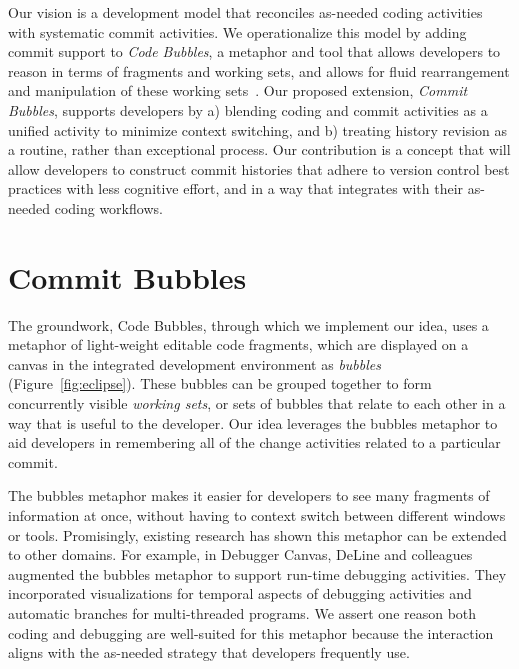 \documentclass[conference]{IEEEtran}
\newcommand{\purpose}[1]{}
\begin{document}
\purpose{we envision a tool that treats history revision as routine and integrates it with coding} 
Our vision is a development model that reconciles as-needed coding activities with systematic commit activities. 
We operationalize this model by adding commit support to \emph{Code Bubbles}, a metaphor and tool that allows developers 
to reason in terms of fragments and working sets, and allows for fluid rearrangement and manipulation of these working sets~\cite{Bragdon2010a}.
Our proposed extension, \emph{Commit Bubbles}, supports developers by a) blending coding and commit activities as a 
unified activity to minimize context switching, and b) treating history revision as a routine, rather than exceptional process. 
Our contribution is a concept that will allow developers to construct commit histories that adhere to version control best practices with less cognitive effort, and in a way that integrates with their as-needed coding workflows.





\section{Commit Bubbles}


The groundwork, Code Bubbles, through which we implement our idea, uses a metaphor of light-weight editable code fragments, which are displayed on a canvas in the integrated development environment as \emph{bubbles} (Figure~\ref{fig:eclipse}). 
These bubbles can be grouped together to form concurrently visible \emph{working sets}, or sets of bubbles that relate to each other in a way that is useful to the developer. Our idea leverages the bubbles metaphor to aid developers in remembering all of the change activities related to a particular commit.


The bubbles metaphor makes it easier for developers to see many fragments of information at once, without having to context switch between different windows or tools. 
Promisingly, existing research has shown this metaphor can be extended to other domains. 
For example, in Debugger Canvas, DeLine and colleagues~\cite{DeLine2012} augmented the bubbles metaphor to support run-time debugging activities.
They incorporated visualizations for temporal aspects of debugging activities and automatic branches for multi-threaded programs. 
We assert one reason both coding and debugging are well-suited for this metaphor because the interaction aligns with the as-needed strategy that developers frequently use.
\end{document}
